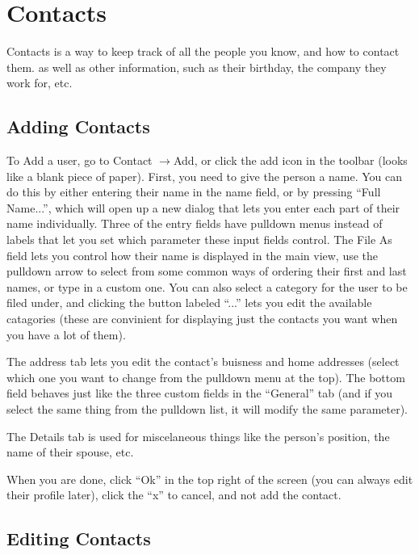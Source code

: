 \documentclass[12pt,letterpaper,oneside, openany]{book} \usepackage[latin1] {inputenc}
\begin{document}
\chapter{Contacts}
Contacts is a way to keep track of all the people you know, and how to contact them.  as well as other information, such as their birthday, the company they work for, etc.

\section{Adding Contacts}

To Add a user, go to Contact \begin{math}\rightarrow{}\end{math}Add, or click the add icon in the toolbar (looks like a blank piece of paper). First, you need to give the person a name. You can do this by either entering their name in the name field, or by pressing ``Full Name...'', which will open up a new dialog that lets you enter each part of their name individually. Three of the entry fields have pulldown menus instead of labels that let you set which parameter these input fields control. The File As field lets you control how their name is displayed in the main view, use the pulldown arrow to select from some common ways of ordering their first and last names, or type in a custom one. You can also select a category for the user to be filed under, and clicking the button labeled ``...'' lets you edit the available catagories (these are convinient for displaying just the contacts you want when you have a lot of them). 

The address tab lets you edit the contact's buisness and home addresses (select which one you want to change from the pulldown menu at the top). The bottom field behaves just like the three custom fields in the ``General'' tab (and if you select the same thing from the pulldown list, it will modify the same parameter). 

The Details tab is used for miscelaneous things like the person's position, the name of their spouse, etc. 

When you are done, click ``Ok'' in the top right of the screen (you can always edit their profile later), click the ``x'' to cancel, and not add the contact. 

\section{Editing Contacts}
\end{document}
